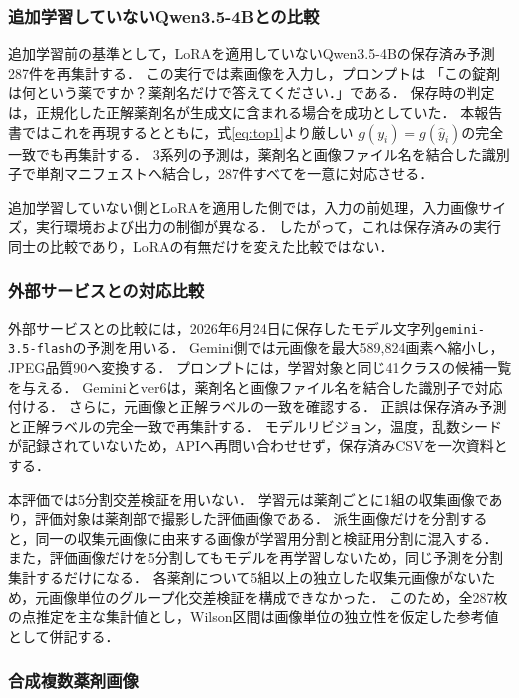 \documentclass[uplatex,dvipdfmx]{jsarticle}
\begin{document}
\subsubsection{追加学習していないQwen3.5-4Bとの比較}

追加学習前の基準として，LoRAを適用していないQwen3.5-4Bの保存済み予測287件を再集計する．
この実行では素画像を入力し，プロンプトは
「この錠剤は何という薬ですか？薬剤名だけで答えてください．」である．
保存時の判定は，正規化した正解薬剤名が生成文に含まれる場合を成功としていた．
本報告書ではこれを再現するとともに，式\eqref{eq:top1}より厳しい
$g(y_i)=g(\hat{y}_i)$の完全一致でも再集計する．
3系列の予測は，薬剤名と画像ファイル名を結合した識別子で単剤マニフェストへ結合し，287件すべてを一意に対応させる．

追加学習していない側とLoRAを適用した側では，入力の前処理，入力画像サイズ，実行環境および出力の制御が異なる．
したがって，これは保存済みの実行同士の比較であり，LoRAの有無だけを変えた比較ではない．

\subsubsection{外部サービスとの対応比較}

外部サービスとの比較には，2026年6月24日に保存したモデル文字列\texttt{gemini-3.5-flash}の予測を用いる\cite{google_gemini35flash}．
Gemini側では元画像を最大589,824画素へ縮小し，JPEG品質90へ変換する．
プロンプトには，学習対象と同じ41クラスの候補一覧を与える．
Geminiとver6は，薬剤名と画像ファイル名を結合した識別子で対応付ける．
さらに，元画像と正解ラベルの一致を確認する．
正誤は保存済み予測と正解ラベルの完全一致で再集計する．
モデルリビジョン，温度，乱数シードが記録されていないため，APIへ再問い合わせせず，保存済みCSVを一次資料とする．

本評価では5分割交差検証を用いない．
学習元は薬剤ごとに1組の収集画像であり，評価対象は薬剤部で撮影した評価画像である．
派生画像だけを分割すると，同一の収集元画像に由来する画像が学習用分割と検証用分割に混入する．
また，評価画像だけを5分割してもモデルを再学習しないため，同じ予測を分割集計するだけになる．
各薬剤について5組以上の独立した収集元画像がないため，元画像単位のグループ化交差検証を構成できなかった．
このため，全287枚の点推定を主な集計値とし，Wilson区間は画像単位の独立性を仮定した参考値として併記する．

\subsubsection{合成複数薬剤画像}\label{sec:multi_eval}
\end{document}
